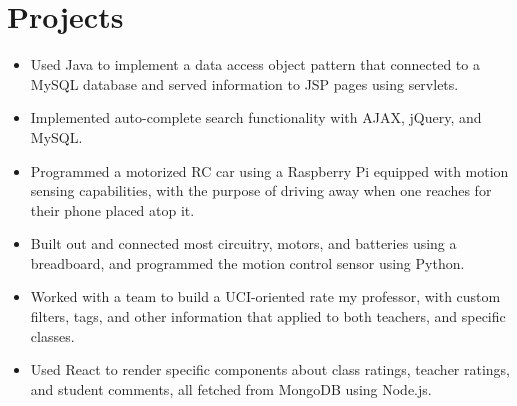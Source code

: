 \documentclass[letterpaper]{styles} %
\begin{document}
\begin{minipage}[t]{0.65\textwidth}
\section{Projects}



\begin{itemize}[leftmargin=.5cm]
\item Used Java to implement a data access object pattern that connected to a MySQL database and served
information to JSP pages using servlets.
\item Implemented auto-complete search functionality with AJAX, jQuery, and MySQL.

\end{itemize}



\begin{itemize}[leftmargin=.5cm]
\item 
Programmed a motorized RC car using a Raspberry Pi equipped with motion sensing capabilities, with the purpose of driving away when one reaches for their phone placed atop it.
\item
Built out and connected most circuitry, motors, and batteries using a breadboard, and programmed the motion control sensor using Python.
\end{itemize}



\begin{itemize}[leftmargin=.5cm]
\item 
Worked with a team to build a UCI-oriented rate my professor, with custom filters, tags, and other information that applied to both teachers, and specific classes.
\item
Used React to render specific components about class ratings, teacher ratings, and student comments, all fetched from MongoDB using Node.js.
\end{itemize}


\end{minipage} %
\end{document}
